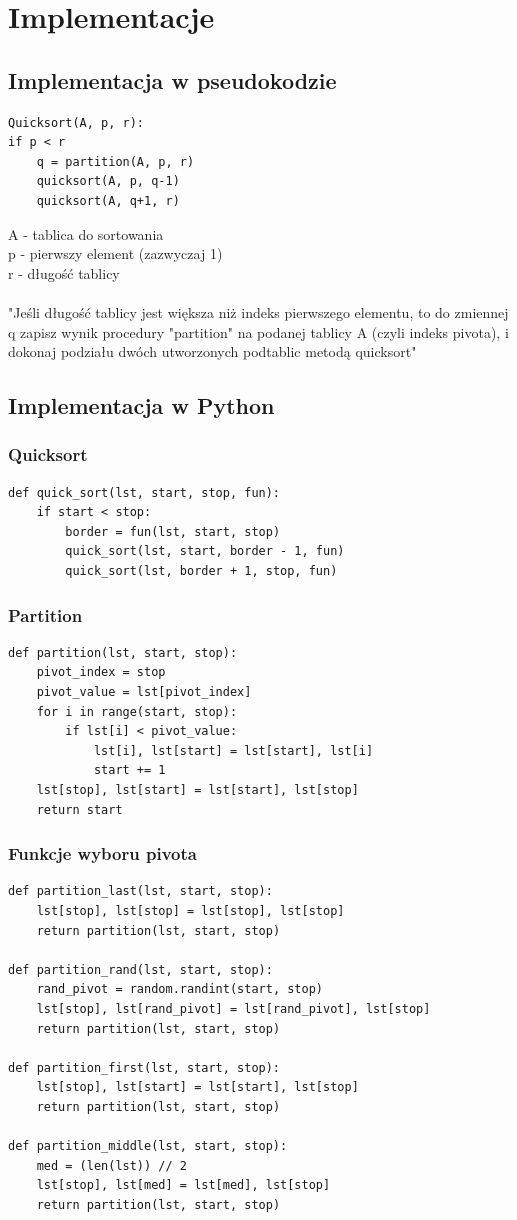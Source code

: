 \documentclass[a4paper,11pt]{report}
\begin{document}
\chapter{Implementacje}
\section{Implementacja w pseudokodzie}
\begin{Verbatim}
Quicksort(A, p, r):
if p < r
	q = partition(A, p, r)
	quicksort(A, p, q-1)
	quicksort(A, q+1, r)
\end{Verbatim}
A - tablica do sortowania\\
p - pierwszy element (zazwyczaj 1)\\
r - długość tablicy\\
\\
"Jeśli długość tablicy jest większa niż indeks pierwszego elementu, to do zmiennej q zapisz wynik procedury "partition" na podanej tablicy A (czyli indeks pivota), i dokonaj podziału dwóch utworzonych podtablic metodą quicksort"  
\section{Implementacja w Python}
\subsection{Quicksort}
\begin{Verbatim}
def quick_sort(lst, start, stop, fun):
    if start < stop:
        border = fun(lst, start, stop)
        quick_sort(lst, start, border - 1, fun)
        quick_sort(lst, border + 1, stop, fun)
\end{Verbatim}
\subsection{Partition}
\begin{Verbatim}
def partition(lst, start, stop):
    pivot_index = stop
    pivot_value = lst[pivot_index]
    for i in range(start, stop):
        if lst[i] < pivot_value:
            lst[i], lst[start] = lst[start], lst[i]
            start += 1
    lst[stop], lst[start] = lst[start], lst[stop]
    return start
\end{Verbatim}
\newpage
\subsection{Funkcje wyboru pivota}
\begin{Verbatim}
def partition_last(lst, start, stop):
    lst[stop], lst[stop] = lst[stop], lst[stop]
    return partition(lst, start, stop)

def partition_rand(lst, start, stop):
    rand_pivot = random.randint(start, stop)
    lst[stop], lst[rand_pivot] = lst[rand_pivot], lst[stop]
    return partition(lst, start, stop)

def partition_first(lst, start, stop):
    lst[stop], lst[start] = lst[start], lst[stop]
    return partition(lst, start, stop)

def partition_middle(lst, start, stop):
    med = (len(lst)) // 2
    lst[stop], lst[med] = lst[med], lst[stop]
    return partition(lst, start, stop)
\end{Verbatim}
\end{document}
